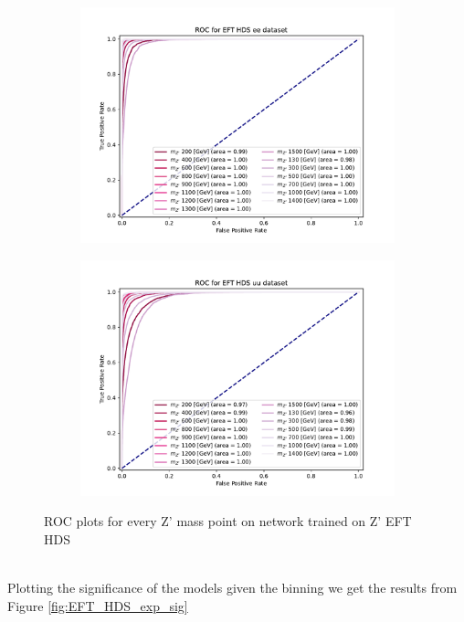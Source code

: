 \documentclass[14pt, a4paper]{book}
\begin{document}
\begin{figure}[!ht]
	\centering
	\begin{subfigure}[b]{0.49\textwidth}
      \centering
      \includegraphics[width=1\textwidth]{XGBoost/EFT_HDS/ROC_ee.pdf}
      \end{subfigure}
   \hfill
   \begin{subfigure}[b]{0.49\textwidth}
      \centering
      \includegraphics[width=1\textwidth]{XGBoost/EFT_HDS/ROC_uu.pdf}
      \end{subfigure}
   \caption{ROC plots for every Z' mass point on network trained on Z' EFT HDS}\label{fig:EFT_HDS_ROCS}
\end{figure}
\\Plotting the significance of the models given the binning we get the results from Figure \ref{fig:EFT_HDS_exp_sig}
\end{document}
